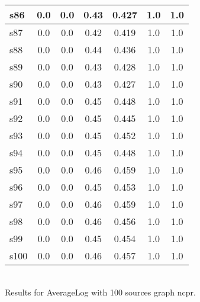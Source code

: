 \documentclass{article}
\begin{document}
\begin{tabular}{|l|c|c|c|c|c|c|}
\hline
s86 &0.0 & 0.0 & 0.43 & 0.427 & 1.0 & 1.0\\
\hline
s87 &0.0 & 0.0 & 0.42 & 0.419 & 1.0 & 1.0\\
\hline
s88 &0.0 & 0.0 & 0.44 & 0.436 & 1.0 & 1.0\\
\hline
s89 &0.0 & 0.0 & 0.43 & 0.428 & 1.0 & 1.0\\
\hline
s90 &0.0 & 0.0 & 0.43 & 0.427 & 1.0 & 1.0\\
\hline
s91 &0.0 & 0.0 & 0.45 & 0.448 & 1.0 & 1.0\\
\hline
s92 &0.0 & 0.0 & 0.45 & 0.445 & 1.0 & 1.0\\
\hline
s93 &0.0 & 0.0 & 0.45 & 0.452 & 1.0 & 1.0\\
\hline
s94 &0.0 & 0.0 & 0.45 & 0.448 & 1.0 & 1.0\\
\hline
s95 &0.0 & 0.0 & 0.46 & 0.459 & 1.0 & 1.0\\
\hline
s96 &0.0 & 0.0 & 0.45 & 0.453 & 1.0 & 1.0\\
\hline
s97 &0.0 & 0.0 & 0.46 & 0.459 & 1.0 & 1.0\\
\hline
s98 &0.0 & 0.0 & 0.46 & 0.456 & 1.0 & 1.0\\
\hline
s99 &0.0 & 0.0 & 0.45 & 0.454 & 1.0 & 1.0\\
\hline
s100 &0.0 & 0.0 & 0.46 & 0.457 & 1.0 & 1.0\\
\hline
\end{tabular}\\

\noindent Results for AverageLog with 100 sources graph ncpr.
\end{document}
